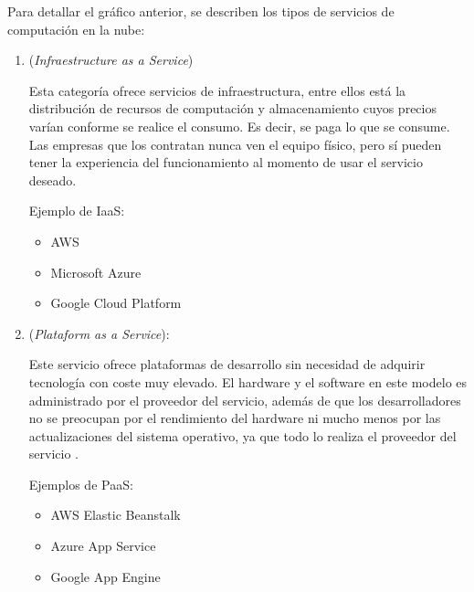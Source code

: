 
Para detallar el gráfico anterior, se describen los tipos de servicios de computación en la nube:

\vspace{1cm}

\begin{enumerate}

\item {}  (\emph{Infraestructure  as  a  Service})

Esta categoría ofrece servicios de infraestructura, entre ellos está la distribución de recursos de computación y almacenamiento cuyos precios varían conforme se realice el consumo. Es decir, se paga lo que se consume. Las empresas que los contratan nunca ven el equipo físico, pero sí pueden tener la experiencia del funcionamiento al momento de usar el servicio deseado.

Ejemplo de IaaS:

\begin{itemize}
\item AWS
\item Microsoft Azure
\item Google Cloud Platform
\end{itemize}

\vspace{0.5cm}

\item {} (\emph{Plataform as a Service}):

Este servicio ofrece plataformas de desarrollo sin necesidad de adquirir tecnología con coste muy elevado. El hardware y el software en este modelo es administrado por el proveedor del servicio, además de que los desarrolladores no se preocupan por el rendimiento del hardware ni mucho menos por las actualizaciones del sistema operativo, ya que todo lo realiza el proveedor del servicio .
 
Ejemplos de PaaS:

\begin{itemize}
\item AWS Elastic Beanstalk
\item Azure App Service
\item Google App Engine

\end{itemize}

\vspace{0.5cm}


\end{enumerate}
